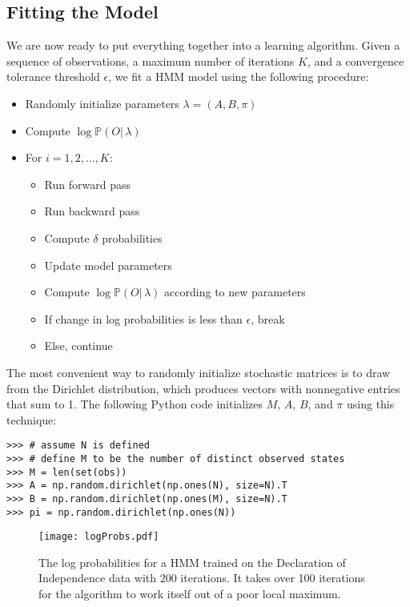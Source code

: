 \subsection*{Fitting the Model}
We are now ready to put everything together into a learning algorithm.
Given a sequence of observations, a maximum number of iterations $K$, and a convergence tolerance threshold $\epsilon$, we fit a HMM model using the following procedure:
\begin{itemize}
\item Randomly initialize parameters $\lambda = (A, B, \pi)$
\item Compute $\log \mathbb{P}(O |\, \lambda)$
\item For $i=1, 2, \ldots, K$:
\begin{itemize}
\item Run forward pass
\item Run backward pass
\item Compute $\delta$ probabilities
\item Update model parameters
\item Compute $\log \mathbb{P}(O |\, \lambda)$ according to new parameters
\item If change in log probabilities is less than $\epsilon$, break
\item Else, continue
\end{itemize}
\end{itemize}

The most convenient way to randomly initialize stochastic matrices is to draw from the Dirichlet distribution,
which produces vectors with nonnegative entries that sum to 1.
The following Python code initializes $M$, $A$, $B$, and $\pi$ using this technique:
\begin{lstlisting}
>>> # assume N is defined
>>> # define M to be the number of distinct observed states
>>> M = len(set(obs))
>>> A = np.random.dirichlet(np.ones(N), size=N).T
>>> B = np.random.dirichlet(np.ones(M), size=N).T
>>> pi = np.random.dirichlet(np.ones(N))
\end{lstlisting}

\begin{figure}
\centering
\texttt{[image: logProbs.pdf]}
\caption{The log probabilities for a HMM trained on the Declaration of Independence
data with 200 iterations. It takes over 100 iterations for the algorithm to work itself out
of a poor local maximum.}
\label{fig:hmm-logprobs}
\end{figure}


